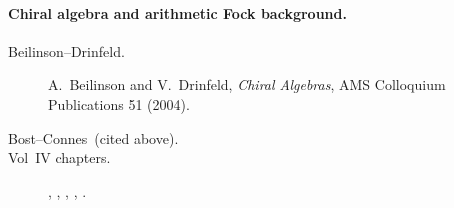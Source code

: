\paragraph{Chiral algebra and arithmetic Fock background.}
\begin{description}
\item[Beilinson--Drinfeld.] A.~Beilinson and V.~Drinfeld,
\emph{Chiral Algebras}, AMS Colloquium Publications 51 (2004).
\item[Bost--Connes~(cited above).]
\item[Vol~IV chapters.] ,
, ,
, .
\end{description}

